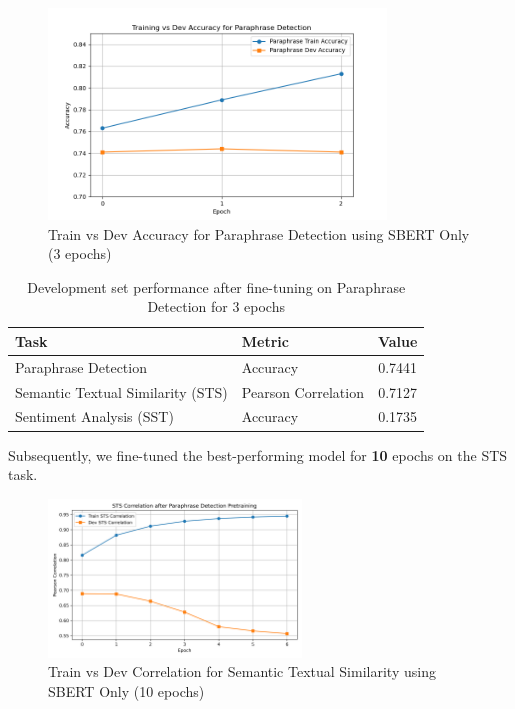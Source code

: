 \begin{figure}[H]
    \centering
    \includegraphics[width=0.8\textwidth]{Figures/Paraphrase_plot_3epochs_SBERT_Only.png}
    \caption{Train vs Dev Accuracy for Paraphrase Detection using SBERT Only (3 epochs)}
    \label{fig:paraphrase_acc_plot}
\end{figure}

\begin{table}[H]
    \centering
    \begin{tabular}{|l|l|c|}
    \hline
    \textbf{Task} & \textbf{Metric} & \textbf{Value} \\ \hline
    Paraphrase Detection & Accuracy & 0.7441 \\ \hline
    Semantic Textual Similarity (STS) & Pearson Correlation & 0.7127 \\ \hline
    Sentiment Analysis (SST) & Accuracy & 0.1735 \\ \hline
    \end{tabular}
    \caption{Development set performance after fine-tuning on Paraphrase Detection for 3 epochs}
    \label{tab:post_finetuning_paraphrase_metrics}
\end{table}

Subsequently, we fine-tuned the best-performing model for \textbf{10} epochs on the STS task.

\begin{figure}[H]
    \centering
    \includegraphics[width=0.6\textwidth]{Figures/STS_plot_10epochs_SBERT_Only.png}
    \caption{Train vs Dev Correlation for Semantic Textual Similarity using SBERT Only (10 epochs)}
    \label{fig:sts_corr_plot}
\end{figure}

